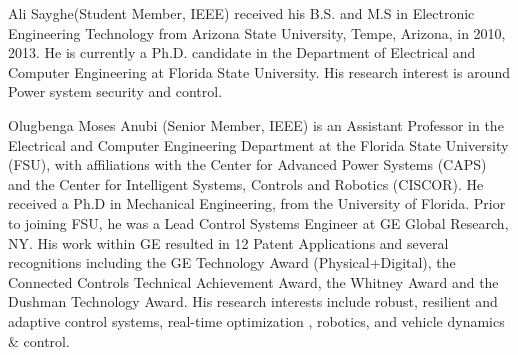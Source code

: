 \documentclass[journal]{IEEEtran}
\begin{document}
\begin{IEEEbiography}{Ali Sayghe(Student Member, IEEE)}
received his B.S. and M.S in Electronic Engineering Technology from Arizona State University, Tempe, Arizona, in 2010, 2013. He is currently a Ph.D. candidate in the Department of Electrical and Computer Engineering at Florida State University. His research interest is around Power system security and control.
\end{IEEEbiography}


\begin{IEEEbiography}{Olugbenga Moses Anubi (Senior Member, IEEE)}
is an Assistant Professor in the Electrical and Computer Engineering Department at the Florida State
University (FSU), with affiliations with the Center
for Advanced Power Systems (CAPS) and the Center
for Intelligent Systems, Controls and Robotics (CISCOR). He received a Ph.D in Mechanical Engineering, from the University of Florida. Prior to joining
FSU, he was a Lead Control Systems Engineer at GE
Global Research, NY. His work within GE resulted
in 12 Patent Applications and several recognitions
including the GE Technology Award (Physical+Digital), the Connected Controls Technical Achievement Award, the Whitney Award and the Dushman
Technology Award. His research interests include robust, resilient and adaptive
control systems, real-time optimization , robotics, and vehicle dynamics \& control.
\end{IEEEbiography}
\fi





\end{document}
